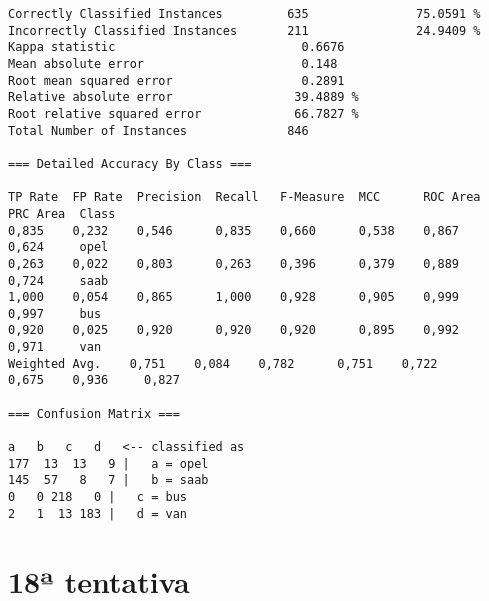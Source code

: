 \documentclass[
	article,			%
	11pt,				%
	oneside,			%
	a4paper,			%
	english,			%
	brazil,				%
	sumario=tradicional
	]{abntex2}
\begin{document}
\begin{lstlisting}
Correctly Classified Instances         635               75.0591 %
Incorrectly Classified Instances       211               24.9409 %
Kappa statistic                          0.6676
Mean absolute error                      0.148 
Root mean squared error                  0.2891
Relative absolute error                 39.4889 %
Root relative squared error             66.7827 %
Total Number of Instances              846     

=== Detailed Accuracy By Class ===

TP Rate  FP Rate  Precision  Recall   F-Measure  MCC      ROC Area  PRC Area  Class
0,835    0,232    0,546      0,835    0,660      0,538    0,867     0,624     opel
0,263    0,022    0,803      0,263    0,396      0,379    0,889     0,724     saab
1,000    0,054    0,865      1,000    0,928      0,905    0,999     0,997     bus
0,920    0,025    0,920      0,920    0,920      0,895    0,992     0,971     van
Weighted Avg.    0,751    0,084    0,782      0,751    0,722      0,675    0,936     0,827     

=== Confusion Matrix ===

a   b   c   d   <-- classified as
177  13  13   9 |   a = opel
145  57   8   7 |   b = saab
0   0 218   0 |   c = bus
2   1  13 183 |   d = van

\end{lstlisting}

\section{18ª tentativa}
\end{document}
